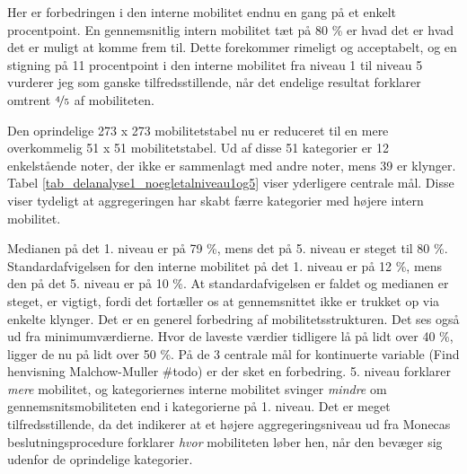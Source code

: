 Her er forbedringen i den interne mobilitet endnu en gang på et enkelt procentpoint.  En gennemsnitlig intern mobilitet tæt på 80 \% er hvad det er hvad det er muligt at komme frem til. Dette forekommer rimeligt og acceptabelt, og en stigning på 11 procentpoint i den interne mobilitet fra niveau 1 til niveau 5 vurderer jeg som ganske tilfredsstillende, når det endelige resultat forklarer omtrent $\nicefrac{4}{5}$ af mobiliteten.

Den oprindelige 273 x 273 mobilitetstabel nu er reduceret til en mere overkommelig 51 x 51 mobilitetstabel. Ud af disse 51 kategorier er 12 enkelstående noter, der ikke er sammenlagt med andre noter, mens 39 er klynger. Tabel \ref{tab_delanalyse1_noegletalniveau1og5} viser yderligere centrale mål. Disse viser tydeligt at aggregeringen har skabt færre kategorier med højere intern mobilitet.



Medianen på det 1. niveau er på 79 \%, mens det på 5. niveau er steget til 80 \%. Standardafvigelsen for den interne mobilitet på det 1. niveau er på 12 \%, mens den på det 5. niveau er på 10 \%. At standardafvigelsen er faldet og medianen er steget, er vigtigt, fordi det fortæller os at gennemsnittet ikke er trukket op via enkelte klynger.  Det er en generel forbedring af mobilitetsstrukturen. Det ses også ud fra minimumværdierne. Hvor de laveste værdier tidligere lå på lidt over 40 \%, ligger de nu på lidt over 50 \%. På de 3 centrale mål for kontinuerte variable (Find henvisning Malchow-Muller \#todo) er der sket en forbedring. 5. niveau forklarer \emph{mere} mobilitet, og kategoriernes interne mobilitet svinger \emph{mindre} om gennemsnitsmobiliteten end i kategorierne på 1. niveau. Det er meget tilfredsstillende, da det indikerer at et højere aggregeringsniveau ud fra Monecas beslutningsprocedure forklarer \emph{hvor} mobiliteten løber hen, når den bevæger sig udenfor de oprindelige kategorier. 


